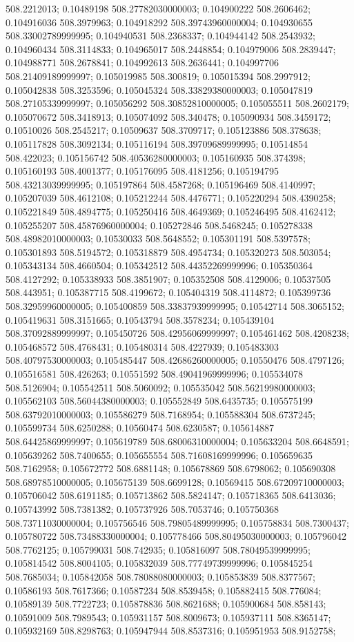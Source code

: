 508.2212013; 0.10489198 508.27782030000003; 0.104900222 508.2606462; 0.104916036 508.3979963; 0.104918292 508.39743960000004; 0.104930655 508.33002789999995; 0.104940531 508.2368337; 0.104944142 508.2543932; 0.104960434 508.3114833; 0.104965017 508.2448854; 0.104979006 508.2839447; 0.104988771 508.2678841; 0.104992613 508.2636441; 0.104997706 508.21409189999997; 0.105019985 508.300819; 0.105015394 508.2997912; 0.105042838 508.3253596; 0.105045324 508.33829380000003; 0.105047819 508.27105339999997; 0.105056292 508.30852810000005; 0.105055511 508.2602179; 0.105070672 508.3418913; 0.105074092 508.340478; 0.105090934 508.3459172; 0.10510026 508.2545217; 0.10509637 508.3709717; 0.105123886 508.378638; 0.105117828 508.3092134; 0.105116194 508.39709689999995; 0.10514854 508.422023; 0.105156742 508.40536280000003; 0.105160935 508.374398; 0.105160193 508.4001377; 0.105176095 508.4181256; 0.105194795 508.43213039999995; 0.105197864 508.4587268; 0.105196469 508.4140997; 0.105207039 508.4612108; 0.105212244 508.4476771; 0.105220294 508.4390258; 0.105221849 508.4894775; 0.105250416 508.4649369; 0.105246495 508.4162412; 0.105255207 508.45876960000004; 0.105272846 508.5468245; 0.105278338 508.48982010000003; 0.10530033 508.5648552; 0.105301191 508.5397578; 0.105301893 508.5194572; 0.105318879 508.4954734; 0.105320273 508.503054; 0.105343134 508.4660504; 0.105342512 508.44352269999996; 0.105350364 508.4127292; 0.105338933 508.3851907; 0.105352508 508.4129006; 0.10537505 508.443951; 0.105387715 508.4199672; 0.105404319 508.4114872; 0.105399736 508.32959960000005; 0.105400859 508.33837939999995; 0.10542714 508.3065152; 0.105419631 508.3151665; 0.10543794 508.3578234; 0.105439104 508.37092889999997; 0.105450726 508.42956069999997; 0.105461462 508.4208238; 0.105468572 508.4768431; 0.105480314 508.4227939; 0.105483303 508.40797530000003; 0.105485447 508.42686260000005; 0.10550476 508.4797126; 0.105516581 508.426263; 0.10551592 508.49041969999996; 0.105534078 508.5126904; 0.105542511 508.5060092; 0.105535042 508.56219980000003; 0.105562103 508.56044380000003; 0.105552849 508.6435735; 0.105575199 508.63792010000003; 0.105586279 508.7168954; 0.105588304 508.6737245; 0.105599734 508.6250288; 0.10560474 508.6230587; 0.105614887 508.64425869999997; 0.105619789 508.68006310000004; 0.105633204 508.6648591; 0.105639262 508.7400655; 0.105655554 508.71608169999996; 0.105659635 508.7162958; 0.105672772 508.6881148; 0.105678869 508.6798062; 0.105690308 508.68978510000005; 0.105675139 508.6699128; 0.10569415 508.67209710000003; 0.105706042 508.6191185; 0.105713862 508.5824147; 0.105718365 508.6413036; 0.105743992 508.7381382; 0.105737926 508.7053746; 0.105750368 508.73711030000004; 0.105756546 508.79805489999995; 0.105758834 508.7300437; 0.105780722 508.73488330000004; 0.105778466 508.80495030000003; 0.105796042 508.7762125; 0.105799031 508.742935; 0.105816097 508.78049539999995; 0.105814542 508.8004105; 0.105832039 508.77749739999996; 0.105845254 508.7685034; 0.105842058 508.78088080000003; 0.105853839 508.8377567; 0.10586193 508.7617366; 0.10587234 508.8539458; 0.105882415 508.776084; 0.10589139 508.7722723; 0.105878836 508.8621688; 0.105900684 508.858143; 0.10591009 508.7989543; 0.105931157 508.8009673; 0.105937111 508.8365147; 0.105932169 508.8298763; 0.105947944 508.8537316; 0.105951953 508.9152758; 